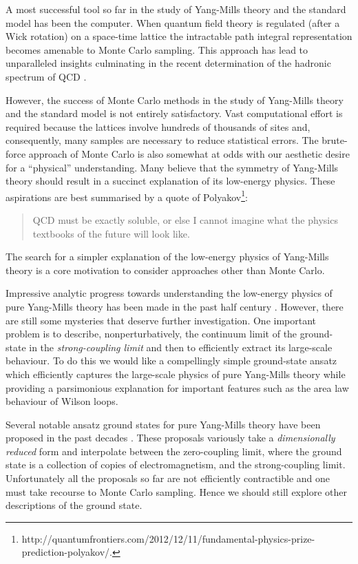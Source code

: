 \documentclass[twocolumn,lengthcheck,superscriptaddress]{revtex4-1}
\theoremstyle{definition}
\theoremstyle{remark}
\begin{document}
A most successful tool so far in the study of Yang-Mills theory and the standard model has been the computer. When quantum field theory is regulated (after a Wick rotation) on a space-time lattice \cite{wilson:1974b, creutz:1985a} the intractable path integral representation becomes amenable to Monte Carlo sampling. This approach has lead to unparalleled insights culminating in the recent determination of the hadronic spectrum of QCD \cite{duerr:2008a}. 

However, the success of Monte Carlo methods in the study of Yang-Mills theory and the standard model is not entirely satisfactory. Vast computational effort is required because the lattices  involve hundreds of thousands of sites and, consequently, many samples are necessary to reduce statistical errors. The brute-force approach of Monte Carlo is also somewhat at odds with our aesthetic desire for a ``physical'' understanding. Many believe that the  symmetry of Yang-Mills theory should result in a succinct explanation of its low-energy physics. These aspirations are best summarised by a quote of Polyakov\footnote{http://quantumfrontiers.com/2012/12/11/fundamental-physics-prize-prediction-polyakov/.}: \begin{quote} QCD must be exactly soluble, or else I cannot imagine what the physics textbooks of the future will look like. \end{quote} The search for a simpler explanation of the low-energy physics of Yang-Mills theory is a core motivation to consider approaches other than Monte Carlo.

Impressive analytic progress towards understanding the low-energy physics of pure Yang-Mills theory has been made in the past half century \cite{thooft:2005}. However, there are still some mysteries that deserve further investigation. One important problem is to describe, nonperturbatively, the continuum limit of the ground-state in the \emph{strong-coupling limit} and then to efficiently extract its large-scale behaviour. To do this we would like a compellingly simple ground-state ansatz which efficiently captures the large-scale physics of pure Yang-Mills theory while providing a parsimonious explanation for important features such as the area law behaviour of Wilson loops. 

Several notable ansatz ground states for pure Yang-Mills theory have been proposed in the past decades \cite{greensite:1979a, feynman:1981a, karabali:1998a, samuel:19967a}. These proposals variously take a \emph{dimensionally reduced} form and interpolate between the zero-coupling limit, where the ground state is a collection of copies of  electromagnetism, and the strong-coupling limit. Unfortunately all the proposals so far are not efficiently contractible and one must take recourse to Monte Carlo sampling. Hence we should still explore other descriptions of the ground state.
\end{document}
